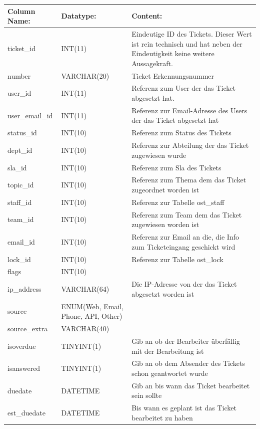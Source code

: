 \begin{table}[h]
	\begin{tabular}{|p{3.5cm}|p{4cm}|p{7.2cm}|}
		\hline
		\textbf{Column Name:} & \textbf{Datatype:} & \textbf{Content:}\\
		\hline
		ticket\_id & INT(11) & Eindeutige ID des Tickets. Dieser Wert ist rein technisch und hat  neben der Eindeutigkeit keine weitere 
		Aussagekraft.\\
		\hline
		number & VARCHAR(20) & Ticket Erkennungsnummer \\
		\hline
		user\_id & INT(11) & Referenz zum User der das Ticket abgesetzt hat.\\
		\hline
		user\_email\_id & INT(11) & Referenz zur Email-Adresse des Users der das Ticket abgesetzt hat\\
		\hline
		status\_id & INT(10) & Referenz zum Status des Tickets\\
		\hline
		dept\_id & INT(10) &  Referenz zur Abteilung der das Ticket zugewiesen wurde\\
		\hline
		sla\_id & INT(10) & Referenz zum Sla des Tickets\\
		\hline
		topic\_id & INT(10) & Referenz zum Thema dem das Ticket zugeordnet worden ist\\
		\hline
		staff\_id & INT(10) & Referenz zur Tabelle ost\_staff \\
		\hline
		team\_id & INT(10) & Referenz zum Team dem das Ticket zugewiesen worden ist \\
		\hline
		email\_id & INT(10) & Referenz zur Email an die, die Info zum Ticketeingang geschickt wird \\
		\hline
		lock\_id & INT(10) & Referenz zur Tabelle ost\_lock \\
		\hline
		flags & INT(10) &  \\
		\hline
		ip\_address & VARCHAR(64) & Die IP-Adresse von der das Ticket abgesetzt worden ist \\
		\hline
		source & ENUM(Web, Email, Phone, API, Other) &\\
		\hline
		source\_extra & VARCHAR(40)&\\
		\hline
		isoverdue & TINYINT(1) & Gib an ob der Bearbeiter überfällig mit der Bearbeitung ist\\
		\hline
		isanswered & TINYINT(1) & Gib an ob dem Absender des Tickets schon geantwortet wurde\\
		\hline
		duedate & DATETIME & Gib an bis wann das Ticket bearbeitet sein sollte\\
		\hline
		est\_duedate & DATETIME & Bis wann es geplant ist das Ticket bearbeitet zu haben \\

\end{tabular}
\end{table}
